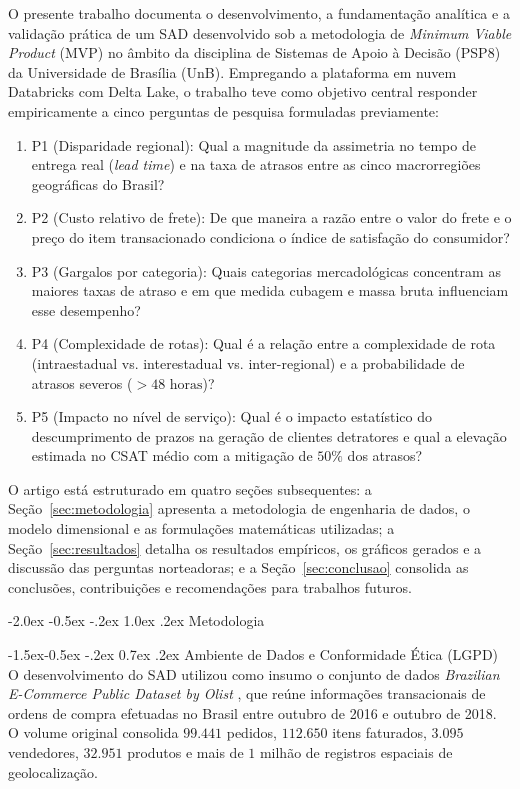 \documentclass[10pt,a4paper,twocolumn]{article}
\makeatletter
\renewcommand\section{\@startsection {section}{1}{\z@}%
                                   {-2.0ex \@plus -0.5ex \@minus -.2ex}%
                                   {1.0ex \@plus .2ex}%
                                   {\normalfont\large\bfseries}}
\renewcommand\subsection{\@startsection{subsection}{2}{\z@}%
                                     {-1.5ex\@plus -0.5ex \@minus -.2ex}%
                                     {0.7ex \@plus .2ex}%
                                     {\normalfont\normalsize\bfseries}}
\makeatother
\begin{document}
O presente trabalho documenta o desenvolvimento, a fundamentação analítica e a validação prática de um SAD desenvolvido sob a metodologia de \textit{Minimum Viable Product} (MVP) no âmbito da disciplina de Sistemas de Apoio à Decisão (PSP8) da Universidade de Brasília (UnB). Empregando a plataforma em nuvem Databricks com Delta Lake, o trabalho teve como objetivo central responder empiricamente a cinco perguntas de pesquisa formuladas previamente:
\begin{enumerate}
    \item P1 (Disparidade regional): Qual a magnitude da assimetria no tempo de entrega real (\textit{lead time}) e na taxa de atrasos entre as cinco macrorregiões geográficas do Brasil?
    \item P2 (Custo relativo de frete): De que maneira a razão entre o valor do frete e o preço do item transacionado condiciona o índice de satisfação do consumidor?
    \item P3 (Gargalos por categoria): Quais categorias mercadológicas concentram as maiores taxas de atraso e em que medida cubagem e massa bruta influenciam esse desempenho?
    \item P4 (Complexidade de rotas): Qual é a relação entre a complexidade de rota (intraestadual vs. interestadual vs. inter-regional) e a probabilidade de atrasos severos ($> 48\text{ horas}$)?
    \item P5 (Impacto no nível de serviço): Qual é o impacto estatístico do descumprimento de prazos na geração de clientes detratores e qual a elevação estimada no CSAT médio com a mitigação de $50\%$ dos atrasos?
\end{enumerate}

O artigo está estruturado em quatro seções subsequentes: a Seção~\ref{sec:metodologia} apresenta a metodologia de engenharia de dados, o modelo dimensional e as formulações matemáticas utilizadas; a Seção~\ref{sec:resultados} detalha os resultados empíricos, os gráficos gerados e a discussão das perguntas norteadoras; e a Seção~\ref{sec:conclusao} consolida as conclusões, contribuições e recomendações para trabalhos futuros.

\section{Metodologia}
\label{sec:metodologia}

\subsection{Ambiente de Dados e Conformidade Ética (LGPD)}
O desenvolvimento do SAD utilizou como insumo o conjunto de dados \textit{Brazilian E-Commerce Public Dataset by Olist} \citep{olist2018dataset}, que reúne informações transacionais de ordens de compra efetuadas no Brasil entre outubro de 2016 e outubro de 2018. O volume original consolida $99.441$ pedidos, $112.650$ itens faturados, $3.095$ vendedores, $32.951$ produtos e mais de $1$ milhão de registros espaciais de geolocalização.
\end{document}
